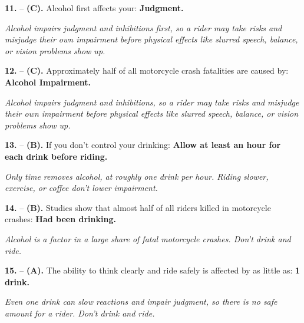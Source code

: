 \begin{minipage}{\linewidth}
\noindent\textbf{11.}  -- \textbf {(C).} Alcohol first affects your:  \textbf {Judgment.} \par \textit {Alcohol impairs judgment and inhibitions first, so a rider may take risks and misjudge their own impairment before physical effects like slurred speech, balance, or vision problems show up.} \\
\end{minipage}

\begin{minipage}{\linewidth}
\noindent\textbf{12.}  -- \textbf {(C).} Approximately half of all motorcycle crash fatalities are caused by:  \textbf {Alcohol Impairment.} \par \textit {Alcohol impairs judgment and inhibitions, so a rider may take risks and misjudge their own impairment before physical effects like slurred speech, balance, or vision problems show up.} \\
\end{minipage}

\begin{minipage}{\linewidth}
\noindent\textbf{13.}  -- \textbf {(B).} If you don't control your drinking:  \textbf {Allow at least an hour for each drink before riding.} \par \textit {Only time removes alcohol, at roughly one drink per hour. Riding slower, exercise, or coffee don't lower impairment.} \\
\end{minipage}

\begin{minipage}{\linewidth}
\noindent\textbf{14.}  -- \textbf {(B).} Studies show that almost half of all riders killed in motorcycle crashes:  \textbf {Had been drinking.} \par \textit {Alcohol is a factor in a large share of fatal motorcycle crashes. Don't drink and ride.} \\
\end{minipage}

\begin{minipage}{\linewidth}
\noindent\textbf{15.}  -- \textbf {(A).} The ability to think clearly and ride safely is affected by as little as:  \textbf {1 drink.} \par \textit {Even one drink can slow reactions and impair judgment, so there is no safe amount for a rider. Don't drink and ride.} \\
\end{minipage}

